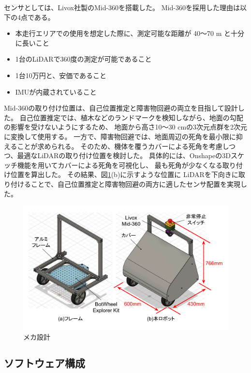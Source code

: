 \documentclass[twocolumn,9pt]{jsproceedings}
\begin{document}
センサとしては、Livox社製のMid-360を搭載した。
Mid-360を採用した理由は以下の4点である。

\begin{itemize}
  \item[1] 本走行エリアでの使用を想定した際に、測定可能な距離が 40〜70 m と十分に長いこと
  \item[2] 1台のLiDARで360度の測定が可能であること
  \item[3] 1台10万円と、安価であること
  \item[4] IMUが内蔵されていること
\end{itemize}

Mid-360の取り付け位置は、自己位置推定と障害物回避の両立を目指して設計した。
自己位置推定では、植木などのランドマークを検知しながら、地面の勾配の影響を受けないようにするため、
地面から高さ10〜30 cmの3次元点群を2次元に変換して使用する。
一方で、障害物回避では、地面周辺の死角を最小限に抑えることが求められる。
そのため、機体を覆うカバーによる死角を考慮しつつ、最適なLiDARの取り付け位置を検討した。
具体的には、Onshapeの3Dスケッチ機能を用いてカバーによる死角を可視化し、
最も死角が少なくなる取り付け位置を算出した。
その結果、図\ref{fig:trainee_flame}(b)に示すような位置に
LiDARを下向きに取り付けることで、自己位置推定と障害物回避の両方に適したセンサ配置を実現した。

\begin{figure}[h]
  \begin{center}
    \includegraphics[width=1.0\linewidth]{figs/robot_flame.pdf}
    \caption{メカ設計}
    \label{fig:trainee_flame}
  \end{center}
\end{figure}

\subsection{ソフトウェア構成}\label{sub:software}
\end{document}
